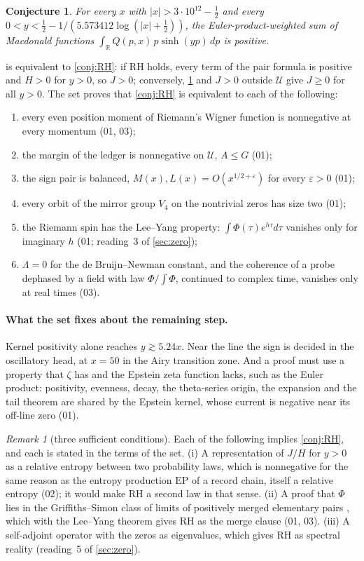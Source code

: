 \documentclass[11pt]{article}
\newtheorem{conjecture}{Conjecture}
\theoremstyle{definition}\newtheorem{definition}[theorem]{Definition}
\theoremstyle{remark}\newtheorem{remark}[theorem]{Remark}
\newcommand{\R}{\mathbb R}\newcommand{\C}{\mathbb C}\newcommand{\N}{\mathbb N}
\begin{document}
\begin{conjecture}\label{conj:step}
For every $x$ with $|x|>3\cdot10^{12}-\frac12$ and every $0<y<\frac12-1/(5.573412\log(|x|+\frac12))$, the Euler-product-weighted sum of Macdonald functions $\int_\R Q(p,x)\,p\sinh(yp)\,dp$ is positive.
\end{conjecture}

 is equivalent to \cref{conj:RH}: if RH holds, every term of the pair formula is positive and $H>0$ for $y>0$, so $J>0$; conversely, \cref{conj:step} and $J>0$ outside $\mathcal U$ give $J\ge0$ for all $y>0$. The set proves that \cref{conj:RH} is equivalent to each of the following:
\begin{enumerate}[label=(\alph*)]
\item every even position moment of Riemann's Wigner function is nonnegative at every momentum (01, 03);
\item the margin of the ledger is nonnegative on $\mathcal U$, $A\le G$ (01);
\item the sign pair is balanced, $M(x),L(x)=O(x^{1/2+\varepsilon})$ for every $\varepsilon>0$ (01);
\item every orbit of the mirror group $V_4$ on the nontrivial zeros has size two (01);
\item the Riemann spin has the Lee--Yang property: $\int\Phi(\tau)e^{h\tau}d\tau$ vanishes only for imaginary $h$ (01; reading~3 of \cref{sec:zero});
\item $\Lambda=0$ for the de Bruijn--Newman constant, and the coherence of a probe dephased by a field with law $\Phi/\int\Phi$, continued to complex time, vanishes only at real times (03).
\end{enumerate}

\paragraph{What the set fixes about the remaining step.} Kernel positivity alone reaches $y\gtrsim5.24x$. Near the line the sign is decided in the oscillatory head, at $x=50$ in the Airy transition zone. And a proof must use a property that $\zeta$ has and the Epstein zeta function lacks, such as the Euler product: positivity, evenness, decay, the theta-series origin, the expansion and the tail theorem are shared by the Epstein kernel, whose current is negative near its off-line zero (01).

\begin{remark}[three sufficient conditions]\label{rem:routes}
Each of the following implies \cref{conj:RH}, and each is stated in the terms of the set. (i) A representation of $J/H$ for $y>0$ as a relative entropy between two probability laws, which is nonnegative for the same reason as the entropy production $\mathrm{EP}$ of a record chain, itself a relative entropy (02); it would make RH a second law in that sense. (ii) A proof that $\Phi$ lies in the Griffiths--Simon class of limits of positively merged elementary pairs \cite{SimonGriffiths}, which with the Lee--Yang theorem gives RH as the merge clause (01, 03). (iii) A self-adjoint operator with the zeros as eigenvalues, which gives RH as spectral reality (reading~5 of \cref{sec:zero}).
\end{remark}
\end{document}

